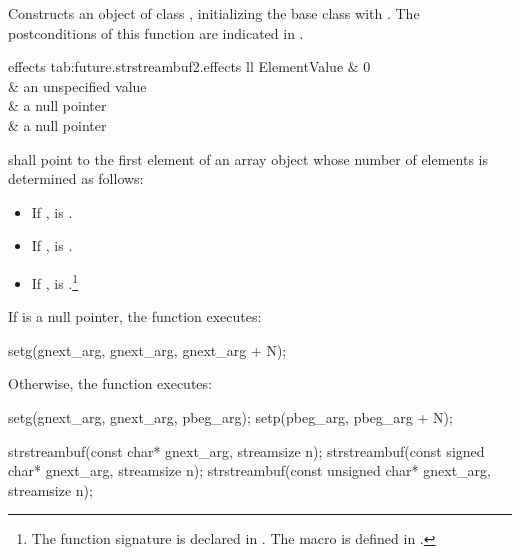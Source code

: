 \begin{itemdescr}
\pnum
\effects
Constructs an object of class
,
initializing the base class with
.
The postconditions of this function are indicated in .

\begin{libtab2}{ effects}
{tab:future.strstreambuf2.effects}
{ll}
{Element}{Value}
	&	0						\\
	&	an unspecified value	\\
	&	a null pointer			\\
	&	a null pointer			\\
\end{libtab2}

\pnum
{} shall point to the first element of an array
object whose number of elements  is determined as follows:
\begin{itemize}
\item
If
,
 is .
\item
If
,
 is
.
%
\item
If
,
 is
.\footnote{The function signature
%
is declared in
%
.
The macro
is defined in
%
.}
\end{itemize}

\pnum
If  is a null pointer, the function executes:

\begin{codeblock}
setg(gnext_arg, gnext_arg, gnext_arg + N);
\end{codeblock}

\pnum
Otherwise, the function executes:

\begin{codeblock}
setg(gnext_arg, gnext_arg, pbeg_arg);
setp(pbeg_arg,  pbeg_arg + N);
\end{codeblock}
\end{itemdescr}


%
\begin{itemdecl}
strstreambuf(const char* gnext_arg, streamsize n);
strstreambuf(const signed char* gnext_arg, streamsize n);
strstreambuf(const unsigned char* gnext_arg, streamsize n);
\end{itemdecl}

